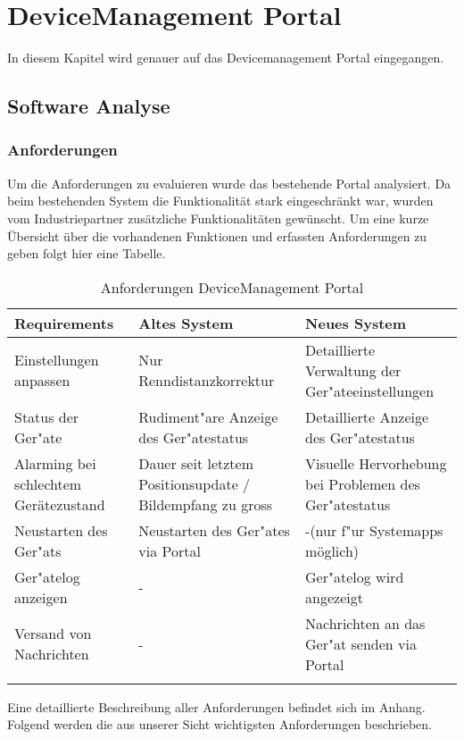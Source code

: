 \chapter{DeviceManagement Portal}

In diesem Kapitel wird genauer auf das Devicemanagement Portal eingegangen.

\section{Software Analyse}

\subsection{Anforderungen}
Um die Anforderungen zu evaluieren wurde das bestehende Portal analysiert. Da beim bestehenden System die Funktionalität stark eingeschränkt war, wurden vom Industriepartner zusätzliche Funktionalitäten gewünscht.
Um eine kurze Übersicht über die vorhandenen Funktionen und erfassten Anforderungen zu geben folgt hier eine Tabelle.

{\renewcommand{\arraystretch}{2}%
    \begin{longtable}{  p{3.5cm} | p{4.3cm} | p{4.3cm} }

    \textbf{Requirements} & \textbf{Altes System} & \textbf{Neues System} \\ \hline
\hline
    Einstellungen anpassen & Nur Renndistanzkorrektur & Detaillierte Verwaltung der Ger"{a}teeinstellungen \\ \hline
    Status der Ger"{a}te & Rudiment"{a}re Anzeige des Ger"{a}testatus & Detaillierte Anzeige des Ger"{a}testatus \\
    \hline
     Alarming bei schlechtem Gerätezustand & Dauer seit letztem Positionsupdate / Bildempfang zu gross & Visuelle Hervorhebung bei Problemen des Ger"{a}testatus \\
    \hline
    Neustarten des Ger"{a}ts & Neustarten des Ger"{a}tes via Portal & -(nur f"{u}r Systemapps möglich)\\
    \hline
    Ger"{a}telog anzeigen & - & Ger"{a}telog wird angezeigt\\
    \hline
    Versand von Nachrichten & - & Nachrichten an das Ger"{a}t senden via Portal\\

\caption{Anforderungen DeviceManagement Portal}
\end{longtable}}

Eine detaillierte Beschreibung aller Anforderungen befindet sich im Anhang. Folgend werden die aus unserer Sicht wichtigsten Anforderungen beschrieben.

